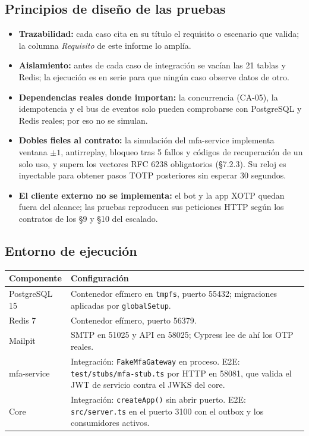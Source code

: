 \documentclass[11pt,a4paper]{report}
\begin{document}
\subsection{Principios de diseño de las pruebas}
\begin{itemize}[leftmargin=*]
\item \textbf{Trazabilidad:} cada caso cita en su título el requisito o escenario que valida; la columna \emph{Requisito} de este informe lo amplía.
\item \textbf{Aislamiento:} antes de cada caso de integración se vacían las 21 tablas y Redis; la ejecución es en serie para que ningún caso observe datos de otro.
\item \textbf{Dependencias reales donde importan:} la concurrencia (CA-05), la idempotencia y el bus de eventos solo pueden comprobarse con PostgreSQL y Redis reales; por eso no se simulan.
\item \textbf{Dobles fieles al contrato:} la simulación del mfa-service implementa ventana $\pm1$, antirreplay, bloqueo tras 5 fallos y códigos de recuperación de un solo uso, y supera los vectores RFC 6238 obligatorios (§7.2.3). Su reloj es inyectable para obtener pasos TOTP posteriores sin esperar 30 segundos.
\item \textbf{El cliente externo no se implementa:} el bot y la app XOTP quedan fuera del alcance; las pruebas reproducen sus peticiones HTTP según los contratos de los §9 y §10 del escalado.
\end{itemize}

\subsection{Entorno de ejecución}
\begin{center}
\begin{tabularx}{\linewidth}{@{}lX@{}}
\toprule
Componente & Configuración \\
\midrule
PostgreSQL 15 & Contenedor efímero en \texttt{tmpfs}, puerto 55432; migraciones aplicadas por \texttt{globalSetup}. \\
Redis 7 & Contenedor efímero, puerto 56379. \\
Mailpit & SMTP en 51025 y API en 58025; Cypress lee de ahí los OTP reales. \\
mfa-service & Integración: \texttt{FakeMfaGateway} en proceso. E2E: \texttt{test/stubs/mfa-stub.ts} por HTTP en 58081, que valida el JWT de servicio contra el JWKS del core. \\
Core & Integración: \texttt{createApp()} sin abrir puerto. E2E: \texttt{src/server.ts} en el puerto 3100 con el outbox y los consumidores activos. \\
\bottomrule
\end{tabularx}
\end{center}
\end{document}
